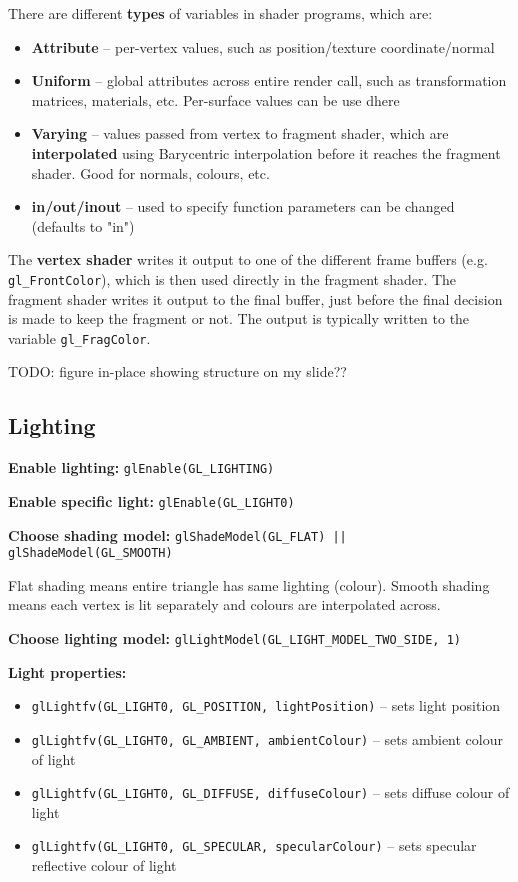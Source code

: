 \documentclass{article}
\begin{document}
There are different \textbf{types} of variables in shader programs, which are:
\begin{itemize}
	\item \textbf{Attribute} -- per-vertex values, such as position/texture coordinate/normal
	\item \textbf{Uniform} -- global attributes across entire render call, such as transformation matrices, materials, etc. Per-surface values can be use dhere
	\item \textbf{Varying} -- values passed from vertex to fragment shader, which are \textbf{interpolated} using Barycentric interpolation before it reaches the fragment shader. Good for normals, colours, etc.
	\item \textbf{in/out/inout} -- used to specify function parameters can be changed (defaults to "in")
\end{itemize}

The \textbf{vertex shader} writes it output to one of the different frame buffers (e.g. \texttt{gl\_FrontColor}), which is then used directly in the fragment shader. The fragment shader writes it output to the final buffer, just before the final decision is made to keep the fragment or not. The output is typically written to the variable \texttt{gl\_FragColor}.

TODO: figure in-place showing structure on my slide??

\subsection{Lighting}

\textbf{Enable lighting:} \texttt{glEnable(GL\_LIGHTING)}

\textbf{Enable specific light:} \texttt{glEnable(GL\_LIGHT0)}

\textbf{Choose shading model:} \texttt{glShadeModel(GL\_FLAT) || glShadeModel(GL\_SMOOTH)}

Flat shading means entire triangle has same lighting (colour). Smooth shading means each vertex is lit separately and colours are interpolated across.

\textbf{Choose lighting model:} \texttt{glLightModel(GL\_LIGHT\_MODEL\_TWO\_SIDE, 1)}

\textbf{Light properties:}
\begin{itemize}
	\item \texttt{glLightfv(GL\_LIGHT0, GL\_POSITION, lightPosition)} -- sets light position
	\item \texttt{glLightfv(GL\_LIGHT0, GL\_AMBIENT, ambientColour)} -- sets ambient colour of light
	\item \texttt{glLightfv(GL\_LIGHT0, GL\_DIFFUSE, diffuseColour)} -- sets diffuse colour of light
	\item \texttt{glLightfv(GL\_LIGHT0, GL\_SPECULAR, specularColour)} -- sets specular reflective colour of light
\end{itemize}
\end{document}
